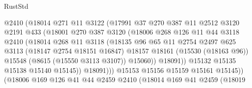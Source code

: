 \begin{lexlean}{RustStd}
\begin{coremodule}
                            @2410
                            (@18014
                              @271
                              @11
                              @3122
                              (@17991
                                @37
                                @270
                                @387
                                @11
                                @2512
                                @3120
                                @2191
                                @433
                                (@18001
                                  @270
                                  @387
                                  @3120
                                  (@18006
                                    @268
                                    @126
                                    @11
                                    @44
                                    @3118
                                    @2410
                                    (@18014
                                      @268
                                      @11
                                      @3118
                                      (@18135
                                        @96
                                        @65
                                        @11
                                        @2754
                                        @2497
                                        @625
                                        @3113
                                        (@18147 @2754 @18151 @16847)
                                        @18157
                                        @18161
                                        (@15530 (@18163 @96))
                                        @15548
                                        (@8615 (@15550 @3113 @3107))
                                        @15060))
                                    @18091))
                                @15132
                                @15135
                                @15138
                                @15140
                                @15145))
                            @18091)))
                      @15153
                      @15156
                      @15159
                      @15161
                      @15145))
                  (@18006
                    @169
                    @126
                    @41
                    @44
                    @2459
                    @2410
                    (@18014
                      @169
                      @41
                      @2459
                      (@18019

\end{coremodule}
\end{lexlean}
